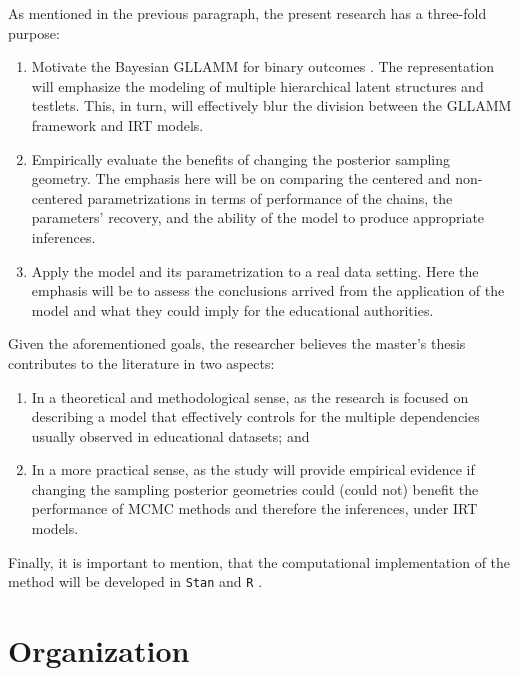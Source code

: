 As mentioned in the previous paragraph, the present research has a three-fold purpose:

\begin{enumerate}
	\item Motivate the Bayesian GLLAMM for binary outcomes \cite{Rabe_et_al_2004a, Rabe_et_al_2004b, Skrondal_et_al_2004a, Rabe_et_al_2012}. The representation will emphasize the modeling of multiple hierarchical latent structures and testlets. This, in turn, will effectively blur the division between the GLLAMM framework and IRT models.
	
	\item Empirically evaluate the benefits of changing the posterior sampling geometry. The emphasis here will be on comparing the centered and non-centered parametrizations \cite{Gelfand_et_al_1995, Gelfand_et_al_1996} in terms of performance of the chains, the parameters' recovery, and the ability of the model to produce appropriate inferences.
	
	\item Apply the model and its parametrization to a real data setting. Here the emphasis will be to assess the conclusions arrived from the application of the model and what they could imply for the educational authorities.
\end{enumerate}

\noindent Given the aforementioned goals, the researcher believes the master's thesis contributes to the literature in two aspects: 

\begin{enumerate}
	\item In a theoretical and methodological sense, as the research is focused on describing a model that effectively controls for the multiple dependencies usually observed in educational datasets; and 
	
	\item In a more practical sense, as the study will provide empirical evidence if changing the sampling posterior geometries could (could not) benefit the performance of MCMC methods and therefore the inferences, under IRT models.
\end{enumerate}

\noindent Finally, it is important to mention, that the computational implementation of the method will be developed in \texttt{Stan} \cite{Stan2020} and \texttt{R} \cite{R2015, RStan2020}.



\section{Organization}

